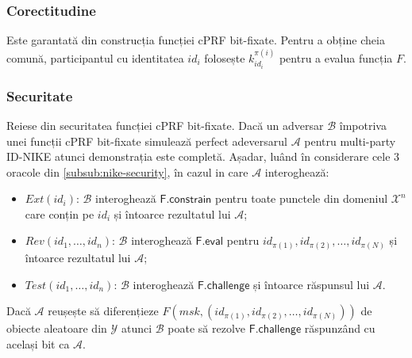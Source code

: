 \documentclass[oneside, 12pt]{book}
\begin{document}
\subsubsection{Corectitudine}
	Este garantată din construcția funcției cPRF bit-fixate. Pentru a obține cheia comună, participantul cu identitatea $id_i$ folosește $k^{\pi(i)}_{id_i}$ pentru a evalua funcția $F$.

\subsubsection{Securitate}
	Reiese din securitatea funcției cPRF bit-fixate. Dacă un adversar $\mathcal{B}$ împotriva unei funcții cPRF bit-fixate simulează perfect adeversarul $\mathcal{A}$ pentru multi-party ID-NIKE atunci demonstrația este completă. Așadar, luând în considerare cele $3$ oracole din \ref{subsub:nike-security}, în cazul in care $\mathcal{A}$ interoghează:
	\begin{itemize}
		\item $Ext(id_i)$: $\mathcal{B}$ interoghează $\mathsf{F.constrain}$ pentru toate punctele din domeniul $\mathcal{X}^n$ care conțin pe $id_i$ și întoarce rezultatul lui $\mathcal{A}$;
		\item $Rev(id_1, \dots, id_n)$: $\mathcal{B}$ interoghează $\mathsf{F.eval}$ pentru $id_{\pi(1)}, id_{\pi(2)}, \dots, id_{\pi(N)}$ și întoarce rezultatul lui $\mathcal{A}$;
		\item $Test(id_1, \dots, id_n)$: $\mathcal{B}$ interoghează $\mathsf{F.challenge}$ și întoarce răspunsul lui $\mathcal{A}$.
	\end{itemize}

	Dacă $\mathcal{A}$ reușește să diferențieze $F(msk, (id_{\pi(1)}, id_{\pi(2)}, \dots, id_{\pi(N)}))$ de obiecte aleatoare din $\mathcal{Y}$ atunci $\mathcal{B}$ poate să rezolve $\mathsf{F.challenge}$ răspunzând cu același bit ca $\mathcal{A}$.
\end{document}

